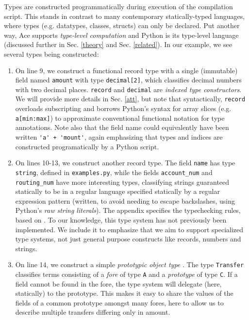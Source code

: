 \documentclass[10pt,preprint]{sigplanconf}
\begin{document}
Types are constructed programmatically during execution of the compilation script. This stands in contrast to many  contemporary statically-typed languages, where types (e.g. datatypes, classes, structs) can only be declared. Put another way, Ace supports \emph{type-level computation} and Python is its type-level language (discussed further in Sec. \ref{theory} and Sec. \ref{related}). 
In our example, we see several types being constructed:
\begin{enumerate}
\item On line 9, we construct a functional record type with a single (immutable) field named \verb|amount| with type \verb|decimal[2]|, which classifies decimal numbers with two decimal places. \verb|record| and \verb|decimal| are \emph{indexed type constructors}. We will provide more details in Sec. \ref{att}, but note that syntactically, \verb|record| overloads subscripting and borrows Python's syntax for array slices (e.g. \verb|a[min:max]|) to approximate conventional functional notation for type annotations. Note also that the field name could equivalently have been written \lstinline{'a' + 'mount'}, again emphasizing that types and indices are constructed programatically by a Python script.
\item On lines 10-13, we construct another record type. The field \verb|name| has type \verb|string|, defined in \verb|examples.py|, while the fields \verb|account_num| and \verb|routing_num| have more interesting types, classifying strings guaranteed statically to be in a regular language specified statically by a  regular expression pattern (written, to avoid needing to escape backslashes, using Python's \emph{raw string literals}). The appendix specifies the typechecking rules, based on \cite{fulton-thesis}. To our knowledge, this type system has not previously been implemented. We include it to emphasize that we aim to support specialized type systems,  not just general purpose constructs like records, numbers and strings.
\item 
On line 14, we construct a simple \emph{prototypic object type} \cite{Lie86}. The type \verb|Transfer| classifies terms consisting of a \emph{fore} of type \verb|A| and a \emph{prototype} of type \verb|C|. If a field cannot be found in the fore, the type system will delegate (here, statically) to the prototype. This makes it easy to share the values of the fields of a common prototype amongst many fores, here to allow us to describe multiple transfers differing only in amount.
\end{enumerate}
\end{document}
